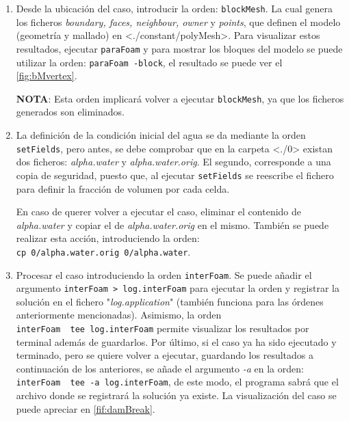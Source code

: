 \begin{enumerate}
\def\labelenumi{\arabic{enumi}.}
\item
  Desde la ubicación del caso, introducir la orden: \texttt{blockMesh}.
  La cual genera los ficheros \emph{boundary, faces, neighbour, owner} y
  \emph{points}, que definen el modelo (geometría y mallado) en
  \textless{}./constant/polyMesh\textgreater{}. Para visualizar estos
  resultados, ejecutar \texttt{paraFoam} y para mostrar los bloques del
  modelo se puede utilizar la orden: \texttt{paraFoam\ -block}, el resultado se puede ver el \autoref{fig:bMvertex}.



  \textbf{NOTA}: Esta orden implicará volver a ejecutar
  \texttt{blockMesh}, ya que los ficheros generados son eliminados.
\item
  La definición de la condición inicial del agua se da mediante la orden
  \texttt{setFields}, pero antes, se debe comprobar que en la carpeta
  \textless{}./0\textgreater{} existan dos ficheros: \emph{alpha.water}
  y \emph{alpha.water.orig}. El segundo, corresponde a una copia de
  seguridad, puesto que, al ejecutar \texttt{setFields} se reescribe el
  fichero para definir la fracción de volumen por cada celda.

  En caso de querer volver a ejecutar el caso, eliminar el contenido de
  \emph{alpha.water} y copiar el de \emph{alpha.water.orig} en el mismo.
  También se puede realizar esta acción, introduciendo la orden:
  \texttt{cp\ 0/alpha.water.orig\ 0/alpha.water}.\\
\item
  Procesar el caso introduciendo la orden \texttt{interFoam}. Se puede
  añadir el argumento \texttt{interFoam\ \textgreater{}\ log.interFoam}
  para ejecutar la orden y registrar la solución en el fichero
  "\emph{log.application}" (también funciona para las órdenes
  anteriormente mencionadas). Asimismo, la orden
  \texttt{interFoam\ \textbar{}\ tee\ log.interFoam} permite visualizar
  los resultados por terminal además de guardarlos. Por último, si el
  caso ya ha sido ejecutado y terminado, pero se quiere volver a
  ejecutar, guardando los resultados a continuación de los anteriores,
  se añade el argumento \emph{-a} en la orden:
  \texttt{interFoam\ \textbar{}\ tee\ -a\ log.interFoam}, de este modo,
  el programa sabrá que el archivo donde se registrará la solución ya
  existe. La visualización del caso se puede apreciar en \autoref{fif:damBreak}.
\end{enumerate}

